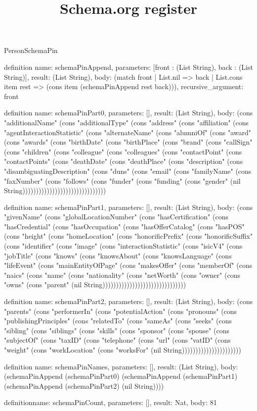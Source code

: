 \begin{lexlean}{PersonSchemaPin}
\title{Schema.org register}
\begin{semanticmodule}
definition{
  name: schemaPinAppend,
  parameters: [front : (List String), back : (List String)],
  result: (List String),
  body: (match front
    | List.nil => back
    | List.cons item rest => (cons item (schemaPinAppend rest back))),
  recursive_argument: front
}

definition{
  name: schemaPinPart0,
  parameters: [],
  result: (List String),
  body: (cons "additionalName" (cons "additionalType" (cons "address" (cons "affiliation" (cons "agentInteractionStatistic" (cons "alternateName" (cons "alumniOf" (cons "award" (cons "awards" (cons "birthDate" (cons "birthPlace" (cons "brand" (cons "callSign" (cons "children" (cons "colleague" (cons "colleagues" (cons "contactPoint" (cons "contactPoints" (cons "deathDate" (cons "deathPlace" (cons "description" (cons "disambiguatingDescription" (cons "duns" (cons "email" (cons "familyName" (cons "faxNumber" (cons "follows" (cons "funder" (cons "funding" (cons "gender" (nil String)))))))))))))))))))))))))))))))
}

definition{
  name: schemaPinPart1,
  parameters: [],
  result: (List String),
  body: (cons "givenName" (cons "globalLocationNumber" (cons "hasCertification" (cons "hasCredential" (cons "hasOccupation" (cons "hasOfferCatalog" (cons "hasPOS" (cons "height" (cons "homeLocation" (cons "honorificPrefix" (cons "honorificSuffix" (cons "identifier" (cons "image" (cons "interactionStatistic" (cons "isicV4" (cons "jobTitle" (cons "knows" (cons "knowsAbout" (cons "knowsLanguage" (cons "lifeEvent" (cons "mainEntityOfPage" (cons "makesOffer" (cons "memberOf" (cons "naics" (cons "name" (cons "nationality" (cons "netWorth" (cons "owner" (cons "owns" (cons "parent" (nil String)))))))))))))))))))))))))))))))
}

definition{
  name: schemaPinPart2,
  parameters: [],
  result: (List String),
  body: (cons "parents" (cons "performerIn" (cons "potentialAction" (cons "pronouns" (cons "publishingPrinciples" (cons "relatedTo" (cons "sameAs" (cons "seeks" (cons "sibling" (cons "siblings" (cons "skills" (cons "sponsor" (cons "spouse" (cons "subjectOf" (cons "taxID" (cons "telephone" (cons "url" (cons "vatID" (cons "weight" (cons "workLocation" (cons "worksFor" (nil String))))))))))))))))))))))
}

definition{
  name: schemaPinNames,
  parameters: [],
  result: (List String),
  body: (schemaPinAppend (schemaPinPart0) (schemaPinAppend (schemaPinPart1) (schemaPinAppend (schemaPinPart2) (nil String))))
}

definition{name: schemaPinCount, parameters: [], result: Nat, body: 81}
\end{semanticmodule}
\end{lexlean}
